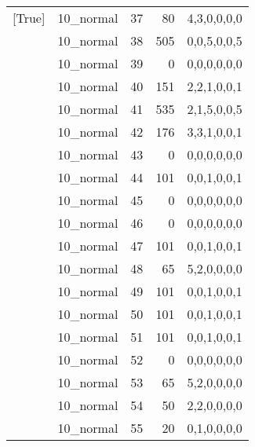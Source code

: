 \begin{tabular}{llrrl}
 [True]          & 10\_normal           &            37 &                    80 & 4,3,0,0,0,0   \\
 [True]          & 10\_normal           &            38 &                   505 & 0,0,5,0,0,5   \\
 [True]          & 10\_normal           &            39 &                     0 & 0,0,0,0,0,0   \\
 [True]          & 10\_normal           &            40 &                   151 & 2,2,1,0,0,1   \\
 [True]          & 10\_normal           &            41 &                   535 & 2,1,5,0,0,5   \\
 [True]          & 10\_normal           &            42 &                   176 & 3,3,1,0,0,1   \\
 [True]          & 10\_normal           &            43 &                     0 & 0,0,0,0,0,0   \\
 [True]          & 10\_normal           &            44 &                   101 & 0,0,1,0,0,1   \\
 [True]          & 10\_normal           &            45 &                     0 & 0,0,0,0,0,0   \\
 [True]          & 10\_normal           &            46 &                     0 & 0,0,0,0,0,0   \\
 [True]          & 10\_normal           &            47 &                   101 & 0,0,1,0,0,1   \\
 [True]          & 10\_normal           &            48 &                    65 & 5,2,0,0,0,0   \\
 [True]          & 10\_normal           &            49 &                   101 & 0,0,1,0,0,1   \\
 [True]          & 10\_normal           &            50 &                   101 & 0,0,1,0,0,1   \\
 [True]          & 10\_normal           &            51 &                   101 & 0,0,1,0,0,1   \\
 [True]          & 10\_normal           &            52 &                     0 & 0,0,0,0,0,0   \\
 [True]          & 10\_normal           &            53 &                    65 & 5,2,0,0,0,0   \\
 [True]          & 10\_normal           &            54 &                    50 & 2,2,0,0,0,0   \\
 [True]          & 10\_normal           &            55 &                    20 & 0,1,0,0,0,0   \\

\end{tabular}
